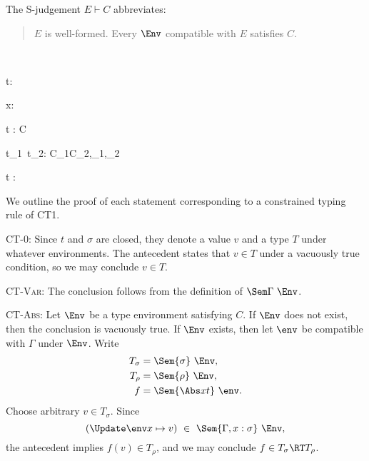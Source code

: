 \documentclass{amsart}
\begin{document}
\begin{samepage}
The S-judgement $E\vdash C$ abbreviates:
\begin{quotation}
$E$ is well-formed. Every $\Env$ compatible with $E$ satisfies $C$.
\end{quotation}
\end{samepage}


~

{t:\rho}

{\Gamma\vdash x:\sigma\Given\emptyset}

{\Gamma\vdash{}t : \sigma\R\rho\Given C}

{\Gamma\vdash t_1~t_2:\beta
\Given C_1\cup C_2,\rho_1\le\alpha\R\beta,\rho_2\le\alpha
}

{\Gamma\vdash\Tabs\alpha t :
\All\alpha{}\cdots{}\rho
\Given\emptyset}


We outline the proof of each statement corresponding to a
constrained typing rule of CT1.

\textsc{CT-0}: Since $t$ and $\sigma$ are closed, they denote a
value $v$ and a type $T$ under whatever environments. The
antecedent states that $v\in T$ under a vacuously true condition,
so we may conclude $v\in T$.

\textsc{CT-Var}: The conclusion follows from the definition of
$\Sem\Gamma~\Env$.

\textsc{CT-Abs}: Let $\Env$ be a type environment satisfying $C$.
If $\Env$ does not exist, then the conclusion is vacuously true.
If $\Env$ exists, then let $\env$ be compatible with $\Gamma$
under $\Env$. Write
\begin{align*}
T_\sigma&=\Sem{\sigma}~\Env,\\
T_\rho&=\Sem{\rho}~\Env,\\
f&=\Sem{\Abs x t}~\env.
\end{align*}
Choose arbitrary $v\in T_\sigma$. Since
\[
(\Update\env x\mapsto v)\ \in\ \Sem{\Gamma,x:\sigma}~\Env,
\]
the antecedent implies $f(v)\in T_\rho$, and we may conclude
$f\in T_\sigma \RT T_\rho$.
\end{document}
